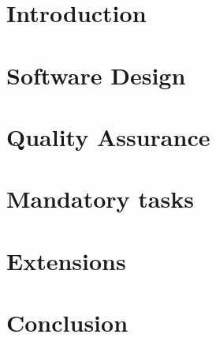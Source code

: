

	
	\frontmatter
		
	
	\newpage	
	\tableofcontents 

	
	\mainmatter
	
	\chapter{Introduction}
	

	\chapter{Software Design}
	
	
	\chapter{Quality Assurance}
	
	 
	
	\chapter{Mandatory tasks}
	
	
	
	
	
	\chapter{Extensions}
	
	
	
	
	
	\chapter{Conclusion}
	
	
	\backmatter
	


